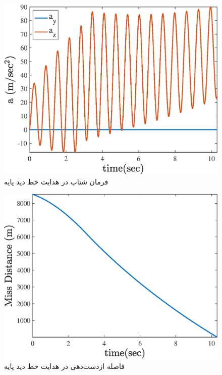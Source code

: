\begin{figure}[H]
	\centering
	\includegraphics[width=.75\linewidth]{../Figure/c/command}
	\caption{فرمان شتاب در هدایت خط دید پایه}
\end{figure}

\begin{figure}[H]
	\centering
	\includegraphics[width=.75\linewidth]{../Figure/c/miss_distance}
	\caption{فاصله ازدست‌دهی در هدایت خط دید پایه}
\end{figure}



